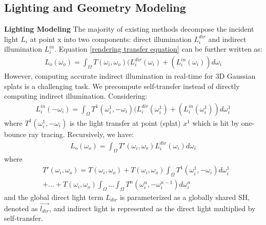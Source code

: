 \subsection{Lighting and Geometry Modeling}\label{4.3}
\textbf{Lighting Modeling} The majority of existing methods decompose the incident light $L_i$ at point x into two components: direct illumination $L_i^{dir}$ and indirect illumination $L_i^{in}$. Equation \ref{rendering transfer equation} can be further written as:
\begin{align}
    L_o(\omega_o)=\int_{\Omega}T(\omega_i,\omega_o)(L_i^{dir}(\omega_i)+(L_i^{in}(\omega_i))d\omega_i
\end{align}
However, computing accurate indirect illumination in real-time for 3D Gaussian splats is a challenging task. We precompute self-transfer instead of directly computing indirect illumination. Considering:
\begin{align}
    L_i^{in}(-\omega_i)=\int_{\Omega}T^{1}(\omega_i^{1},-\omega_i)(L_i^{dir}(\omega_i^{1})+(L_i^{in}(\omega_i^{1}))d\omega_i^{1}
\end{align}
where $T^{1}(\omega_i^{1},-\omega_i)$ is the light transfer at point (splat) $x^1$ which is hit by one-bounce ray tracing.
Recursively, we have:
\begin{align}
    L_o(\omega_o)=\int_{\Omega}T'(\omega_i,\omega_o)L_i^{dir}(\omega_i)d\omega_i \label{recu}
\end{align}
where 
\begin{align}
\label{recu2}
&T'(\omega_i,\omega_o)=T(\omega_i,\omega_o)+T(\omega_i,\omega_o)\int_{\Omega}T^1(\omega_i^1,-\omega_i)d\omega^1_i\\
&+\dots+T(\omega_i,\omega_o)\int_{\Omega}\dots \int_{\Omega}T^n(\omega_i^n,-\omega_i^{n-1})d\omega^n_i \nonumber
\end{align}
and
the global direct light term $L_{dir}$ is parameterized as a globally shared SH, denoted as $\Vec{l_{dir}}$, and indirect light is represented as the direct light multiplied by self-transfer.

